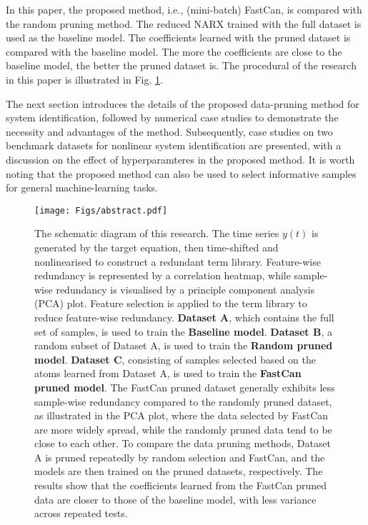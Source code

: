\documentclass{article}
\begin{document}
In this paper, the proposed method, i.e., (mini-batch) FastCan, is compared with the random pruning method.
The reduced NARX trained with the full dataset is used as the baseline model.
The coefficients learned with the pruned dataset is compared with the baseline model.
The more the coefficients are close to the baseline model, the better the pruned dataset is.
The procedural of the research in this paper is illustrated in Fig. \ref{fig:abs}.

The next section introduces the details of the proposed data-pruning method for system identification, followed by numerical case studies to demonstrate the necessity and advantages of the method. 
Subsequently, case studies on two benchmark datasets for nonlinear system identification are presented, with a discussion on the effect of hyperparamteres in the proposed method. 
It is worth noting that the proposed method can also be used to select informative samples for general machine-learning tasks.

\begin{figure}
    \centering
    \texttt{[image: Figs/abstract.pdf]}
    \caption[abs]{The schematic diagram of this research. The time series $y(t)$ is generated by the target equation, then time-shifted and nonlinearised to construct a redundant term library. 
    Feature-wise redundancy is represented by a correlation heatmap, while sample-wise redundancy is visualised by a principle component analysis (PCA) plot. 
    Feature selection is applied to the term library to reduce feature-wise redundancy. 
    \textbf{\textcolor{bg_green}{Dataset A}}\footnotemark, which contains the full set of samples, is used to train the \textbf{\textcolor{bg_green}{Baseline model}}. \textbf{\textcolor{bg_red}{Dataset B}}, a random subset of Dataset A, is used to train the \textbf{\textcolor{bg_red}{Random pruned model}}. 
    \textbf{\textcolor{bg_light_blue}{Dataset C}}, consisting of samples selected based on the atoms learned from Dataset A, is used to train the \textbf{\textcolor{bg_light_blue}{FastCan pruned model}}. 
    The FastCan pruned dataset generally exhibits less sample-wise redundancy compared to the randomly pruned dataset, as illustrated in the PCA plot, where the data selected by FastCan are more widely spread, while the randomly pruned data tend to be close to each other. 
    To compare the data pruning methods, Dataset A is pruned repeatedly by random selection and FastCan, and the models are then trained on the pruned datasets, respectively. 
    The results show that the coefficients learned from the FastCan pruned data are closer to those of the baseline model, with less variance across repeated tests.}
    \label{fig:abs}
\end{figure}
\end{document}
